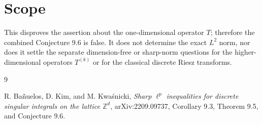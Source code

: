 \documentclass[11pt]{article}
\begin{document}
\section{Scope}

This disproves the assertion about the one-dimensional operator $T$;
therefore the combined Conjecture 9.6 is false.  It does not determine
the exact $L^2$ norm, nor does it settle the separate dimension-free or
sharp-norm questions for the higher-dimensional operators $T^{(k)}$ or
for the classical discrete Riesz transforms.

\begin{thebibliography}{9}
\raggedright
{}
R. Ba\~nuelos, D. Kim, and M. Kwa\'{s}nicki,
\emph{Sharp $\ell^p$ inequalities for discrete singular integrals on
the lattice $\mathbb Z^d$}, arXiv:2209.09737, Corollary 9.3,
Theorem 9.5, and Conjecture 9.6.
\end{thebibliography}
\end{document}
